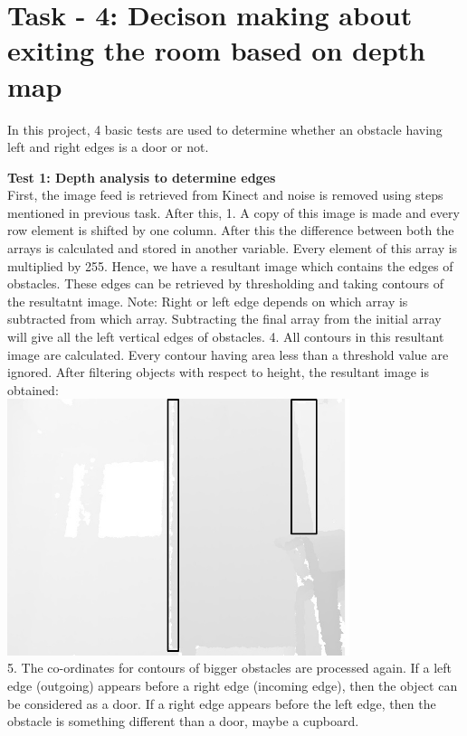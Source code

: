 \documentclass{report}
\begin{document}
\section{Task - 4: Decison making about exiting the room based on depth map}

In this project, 4 basic tests are used to determine whether an obstacle having left and right edges is a door or not.

\textbf{Test 1: Depth analysis to determine edges} \\

First, the image feed is retrieved from Kinect and noise is removed using steps mentioned in previous task. After this,
 1. A copy of this image is made and every row element is shifted by one column. After this the difference between both the arrays is calculated and stored in another variable. Every element of this array is multiplied by 255. Hence, we have a resultant image which contains the edges of obstacles. These edges can be retrieved by thresholding and taking contours of the resultatnt image. Note: Right or left edge depends on which array is subtracted from which array. Subtracting the final array from the initial array will give all the left vertical edges of obstacles.
 4. All contours in this resultant image are calculated. Every contour having area less than a threshold     
    value are ignored. After filtering objects with respect to 
    height, the resultant image is obtained: \\

\includegraphics[width = 10cm]{result.jpg} \\

 5. The co-ordinates for contours of bigger obstacles are processed again. If a left edge (outgoing) 
    appears before a right edge (incoming edge), then the object can be considered as a door. If a right 
    edge appears  before the left edge, then the obstacle is something different than a door, maybe a
    cupboard.
\end{document}

